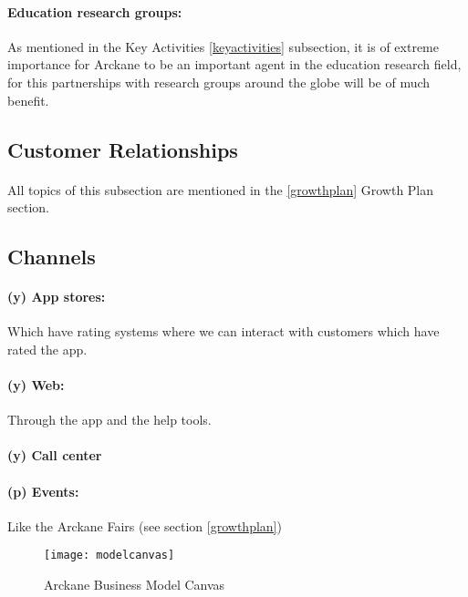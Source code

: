 \paragraph{Education research groups:} As mentioned in the Key Activities \ref{keyactivities} subsection, it is of extreme importance for Arckane to be an important agent in the education research field, for this partnerships with research groups around the globe will be of much benefit.


\subsection{Customer Relationships}

\paragraph{} All topics of this subsection are mentioned in the \ref{growthplan} Growth Plan section.


\subsection{Channels}

\paragraph{(y) App stores:} Which have rating systems where we can interact with customers which have rated the app.

\paragraph{(y) Web:} Through the app and the help tools.

\paragraph{(y) Call center}

\paragraph{(p) Events:} Like the Arckane Fairs (see section \ref{growthplan})

\pagebreak
{} %
\begin{figure}[h] %
    \centering
    \texttt{[image: modelcanvas]}
    \caption{Arckane Business Model Canvas}
    \label{fig:modelcanvas}
\end{figure}
\restoregeometry %
\pagebreak